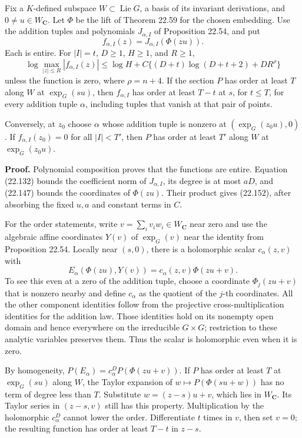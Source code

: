 \documentclass[
  11pt,
  a4paper,
]{article}
\newcounter{none} %
\begin{document}
Fix a \(K\)-defined subspace \(W\subset\operatorname{Lie}G\), a basis of
its invariant derivations, and \(0\ne u\in W_{\mathbf C}\). Let \(\Phi\)
be the lift of Theorem 22.59 for the chosen embedding. Use the addition
tuples and polynomials \(J_{\alpha,I}\) of Proposition 22.54, and put \[
 f_{\alpha,I}(z)=J_{\alpha,I}(\Phi(zu)).
 \tag{22.151}
\] Each is entire. For \(|I|=t\), \(D\ge1\), \(H\ge1\), and \(R\ge1\),
\[
 \log\max_{|z|\le R}|f_{\alpha,I}(z)|
 \le\log H+C\{(D+t)\log(D+t+2)+DR^\rho\}
 \tag{22.152}
\] unless the function is zero, where \(\rho=n+4\). If the section \(P\)
has order at least \(T\) along \(W\) at \(\exp_G(su)\), then
\(f_{\alpha,I}\) has order at least \(T-t\) at \(s\), for \(t\le T\),
for every addition tuple \(\alpha\), including tuples that vanish at
that pair of points.

Conversely, at \(z_0\) choose \(\alpha\) whose addition tuple is nonzero
at \((\exp_G(z_0u),0)\). If \(f_{\alpha,I}(z_0)=0\) for all \(|I|<T'\),
then \(P\) has order at least \(T'\) along \(W\) at \(\exp_G(z_0u)\).

\textbf{Proof.} Polynomial composition proves that the functions are
entire. Equation (22.132) bounds the coefficient norm of
\(J_{\alpha,I}\), its degree is at most \(aD\), and (22.147) bounds the
coordinates of \(\Phi(zu)\). Their product gives (22.152), after
absorbing the fixed \(u,a\) and constant terms in \(C\).

For the order statements, write \(v=\sum_i v_i w_i\in W_{\mathbf C}\)
near zero and use the algebraic affine coordinates \(Y(v)\) of
\(\exp_G(v)\) near the identity from Proposition 22.54. Locally near
\((s,0)\), there is a holomorphic scalar \(c_\alpha(z,v)\) with \[
 E_\alpha(\Phi(zu),Y(v))
   =c_\alpha(z,v)\Phi(zu+v).
 \tag{22.153}
\] To see this even at a zero of the addition tuple, choose a coordinate
\(\Phi_j(zu+v)\) that is nonzero nearby and define \(c_\alpha\) as the
quotient of the \(j\)-th coordinates. All the other component identities
follow from the projective cross-multiplication identities for the
addition law. Those identities hold on its nonempty open domain and
hence everywhere on the irreducible \(G\times G\); restriction to these
analytic variables preserves them. Thus the scalar is holomorphic even
when it is zero.

By homogeneity, \(P(E_\alpha)=c_\alpha^D P(\Phi(zu+v))\). If \(P\) has
order at least \(T\) at \(\exp_G(su)\) along \(W\), the Taylor expansion
of \(w\mapsto P(\Phi(su+w))\) has no term of degree less than \(T\).
Substitute \(w=(z-s)u+v\), which lies in \(W_{\mathbf C}\). Its Taylor
series in \((z-s,v)\) still has this property. Multiplication by the
holomorphic \(c_\alpha^D\) cannot lower the order. Differentiate \(t\)
times in \(v\), then set \(v=0\); the resulting function has order at
least \(T-t\) in \(z-s\).
\end{document}

